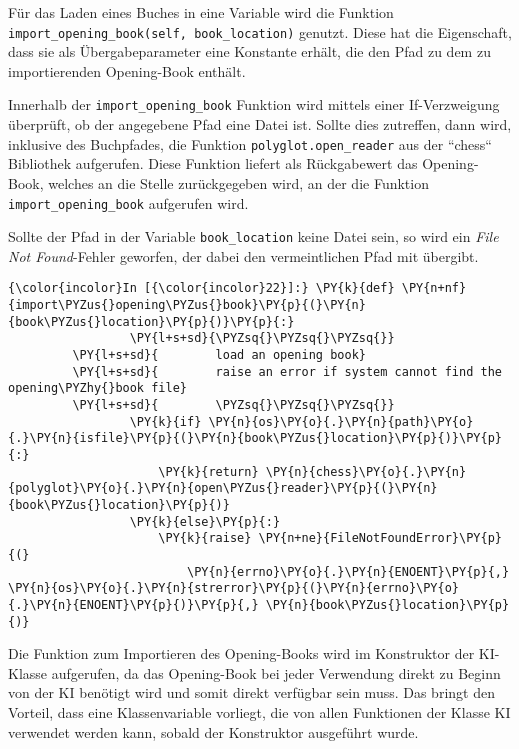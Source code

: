     Für das Laden eines Buches in eine Variable wird die Funktion
\texttt{import\_opening\_book(self,\ book\_location)} genutzt. Diese hat
die Eigenschaft, dass sie als Übergabeparameter eine Konstante erhält,
die den Pfad zu dem zu importierenden Opening-Book enthält.

Innerhalb der \texttt{import\_opening\_book} Funktion wird mittels einer
If-Verzweigung überprüft, ob der angegebene Pfad eine Datei ist. Sollte
dies zutreffen, dann wird, inklusive des Buchpfades, die Funktion
\texttt{polyglot.open\_reader} aus der ``chess`` Bibliothek aufgerufen.
Diese Funktion liefert als Rückgabewert das Opening-Book, welches an die
Stelle zurückgegeben wird, an der die Funktion
\texttt{import\_opening\_book} aufgerufen wird.

Sollte der Pfad in der Variable \texttt{book\_location} keine Datei
sein, so wird ein \emph{File Not Found}-Fehler geworfen, der dabei den
vermeintlichen Pfad mit übergibt.

    \begin{Verbatim}[commandchars=\\\{\}]
{\color{incolor}In [{\color{incolor}22}]:} \PY{k}{def} \PY{n+nf}{import\PYZus{}opening\PYZus{}book}\PY{p}{(}\PY{n}{book\PYZus{}location}\PY{p}{)}\PY{p}{:}
                 \PY{l+s+sd}{\PYZsq{}\PYZsq{}\PYZsq{}}
         \PY{l+s+sd}{        load an opening book}
         \PY{l+s+sd}{        raise an error if system cannot find the opening\PYZhy{}book file}
         \PY{l+s+sd}{        \PYZsq{}\PYZsq{}\PYZsq{}}
                 \PY{k}{if} \PY{n}{os}\PY{o}{.}\PY{n}{path}\PY{o}{.}\PY{n}{isfile}\PY{p}{(}\PY{n}{book\PYZus{}location}\PY{p}{)}\PY{p}{:}
                     \PY{k}{return} \PY{n}{chess}\PY{o}{.}\PY{n}{polyglot}\PY{o}{.}\PY{n}{open\PYZus{}reader}\PY{p}{(}\PY{n}{book\PYZus{}location}\PY{p}{)}
                 \PY{k}{else}\PY{p}{:}
                     \PY{k}{raise} \PY{n+ne}{FileNotFoundError}\PY{p}{(}
                         \PY{n}{errno}\PY{o}{.}\PY{n}{ENOENT}\PY{p}{,} \PY{n}{os}\PY{o}{.}\PY{n}{strerror}\PY{p}{(}\PY{n}{errno}\PY{o}{.}\PY{n}{ENOENT}\PY{p}{)}\PY{p}{,} \PY{n}{book\PYZus{}location}\PY{p}{)}
\end{Verbatim}

    Die Funktion zum Importieren des Opening-Books wird im Konstruktor der
KI-Klasse aufgerufen, da das Opening-Book bei jeder Verwendung direkt zu
Beginn von der KI benötigt wird und somit direkt verfügbar sein muss.
Das bringt den Vorteil, dass eine Klassenvariable vorliegt, die von
allen Funktionen der Klasse KI verwendet werden kann, sobald der
Konstruktor ausgeführt wurde.

